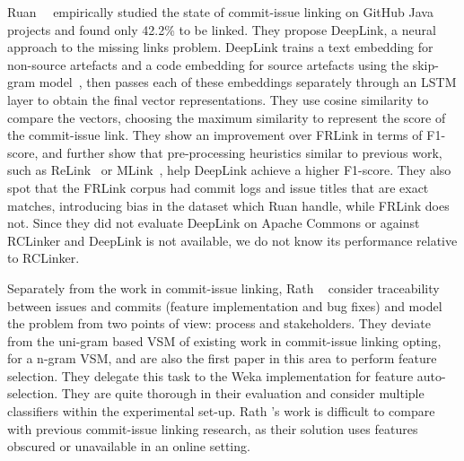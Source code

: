 Ruan~\etal~\cite{ruan2019deeplink} empirically studied the state of commit-issue
linking on GitHub Java projects and found only 42.2\% to be linked. They propose
DeepLink, a neural approach to the missing links problem. DeepLink trains a text
embedding for non-source artefacts and a code embedding for source artefacts
using the skip-gram model~\cite{mikolov2013efficient, mikolov2013distributed},
then passes each of these embeddings separately through an LSTM layer to obtain
the final vector representations. They use cosine similarity to compare the
vectors, choosing the maximum similarity to represent the score of the
commit-issue link. They show an improvement over FRLink in terms of F1-score,
and further show that pre-processing heuristics similar to previous work, such
as ReLink~\cite{relink} or MLink~\cite{MLink}, help DeepLink achieve a higher
F1-score. They also spot that the FRLink corpus had commit logs and issue titles
that are exact matches, introducing bias in the dataset which Ruan \etal handle,
while FRLink does not. Since they did not evaluate DeepLink on Apache Commons or
against RCLinker and DeepLink is not available, we do not know its performance
relative to RCLinker.

Separately from the work in commit-issue linking, Rath \etal~\cite{1804.02433}
consider traceability between issues and commits (feature implementation and bug
fixes) and model the problem from two points of view: process and stakeholders.
They deviate from the uni-gram based VSM of existing work in commit-issue
linking opting, for a n-gram VSM, and are also the first paper in this area to
perform feature selection. They delegate this task to the Weka implementation
for feature auto-selection. They are quite thorough in their evaluation and
consider multiple classifiers within the experimental set-up. Rath \etal's work
is difficult to compare with previous commit-issue linking research, as their
solution uses features obscured or unavailable in an online setting.

